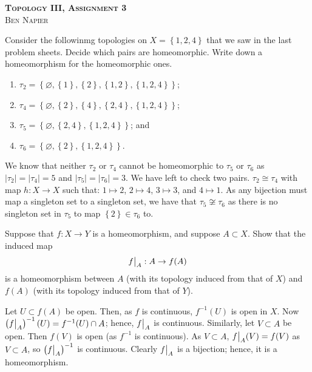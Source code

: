 \documentclass[a4paper, answers]{exam}
\begin{document}
\begin{center}
	\textbf{\textsc{Topology III, Assignment 3}}
	\\
	\textsc{Ben Napier}
	\vspace{1em}
\end{center}
\begin{questions}
	\question
		Consider the followinmg topologies on $X = \left\{ 1,2,4 \right\}$
		that we saw in the last problem sheets.
		Decide which pairs are homeomorphic.
		Write down a homeomorphism for the homeomorphic ones.
		\begin{enumerate}
			\item $\tau_2 = \left\{
					\varnothing,
					\left\{ 1 \right\},
					\left\{ 2 \right\},
					\left\{ 1,2 \right\},
					\left\{ 1,2,4 \right\}
				\right\}$;

			\item $\tau_4 = \left\{
					\varnothing,
					\left\{ 2 \right\},
					\left\{ 4 \right\},
					\left\{ 2,4 \right\},
					\left\{ 1,2,4 \right\}
				\right\}$;

			\item $\tau_5 = \left\{
					\varnothing,
					\left\{ 2,4 \right\},
					\left\{ 1,2,4 \right\}
				\right\}$; and

			\item $\tau_6 = \left\{
					\varnothing,
					\left\{ 2 \right\},
					\left\{ 1,2,4 \right\}
				\right\}$.
		\end{enumerate}

		\begin{solution}
			We know that neither $\tau_2$ or $\tau_4$ cannot be homeomorphic
			to $\tau_5$ or $\tau_6$ as 
			$
				\left\lvert \tau_2 \right\rvert
				= \left\lvert \tau_4 \right\rvert
				= 5
			$
			and 
			$
				\left\lvert \tau_5 \right\rvert
				= \left\lvert \tau_6 \right\rvert
				= 3.
			$
			We have left to check two pairs.
			$\tau_2 \cong \tau_4$ with map $h: X \to X$ such that:
			$1 \mapsto 2$, $2 \mapsto 4$, $3 \mapsto 3$, and $4 \mapsto 1$.
			As any bijection must map a singleton set to a singleton set, we
			have that $\tau_5 \not\cong \tau_6$ as there is no singleton set
			in $\tau_5$ to map $\left\{ 2 \right\} \in \tau_6$ to.
		\end{solution}

	\pagebreak
	\question
		Suppose that $f: X \to Y$ is a homeomorphism, and suppose
		$A \subset X$.
		Show that the induced map
		\[
			\restr{f}{A}: A \to f(A)
		\]
		is a homeomorphism between $A$ (with its topology induced from that 
		of $X$) and $f(A)$ (with its topology induced from that of $Y$).
		\begin{solution}
			Let $U \subset f(A)$ be open.
			Then, as $f$ is continuous, $f^{-1}(U)$ is open in $X$.
			Now $\left( \restr fA \right)^{-1}(U) = f^{-1}(U) \cap A$; hence,
			$\restr fA$ is continuous.
			Similarly, let $V \subset A$ be open.
			Then $f(V)$ is open (as $f^{-1}$ is continuous).
			As $V \subset A$, $\restr fA(V) = f(V)$ as $V \subset A$, so
			$\left( \restr fA \right)^{-1}$ is continuous.
			Clearly $\restr fA$ is a bijection; hence, it is a homeomorphism.
		\end{solution}


\end{questions}
\end{document}
